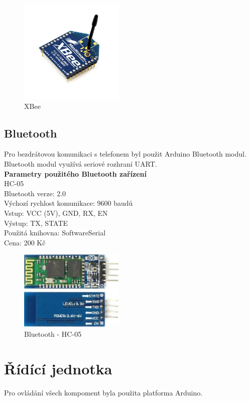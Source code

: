 \begin{figure}[H]
	\centering
	\includegraphics[width=5cm]{pictures/xbee.jpg}
	\caption{XBee}
\end{figure}

\subsection{Bluetooth} 
Pro bezdrátovou komunikaci s telefonem byl použit Arduino Bluetooth modul. Bluetooth modul využívá seriové rozhraní UART.\\

\textbf{Parametry použitého Bluetooth zařízení}\\
HC-05\\
Bluetooth verze: 2.0\\
Výchozí rychlost komunikace: 9600 baudů\\
Vstup: VCC (5V), GND, RX, EN\\
Výstup: TX, STATE\\
Použitá knihovna: SoftwareSerial\\
Cena: 200 Kč\\

\begin{figure}[H]
	\centering
	\includegraphics[width=5cm]{pictures/blue.jpg}
	\caption{Bluetooth - HC-05}
\end{figure}

\section{Řídící jednotka} 
Pro ovládání všech kompoment byla použita platforma Arduino.

